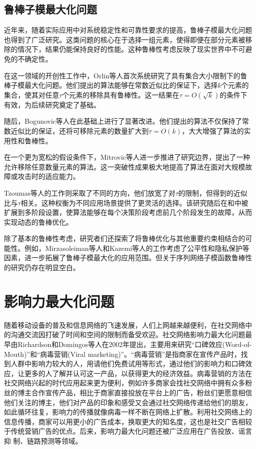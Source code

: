 \subsection{鲁棒子模最大化问题}

近年来，随着实际应用中对系统稳定性和可靠性要求的提高，鲁棒子模最大化问题也得到了广泛研究。这类问题的核心在于选择一组元素，使得即便在部分元素被移除的情况下，结果仍能保持良好的性能。这种鲁棒性考虑反映了现实世界中不可避免的不确定性。

在这一领域的开创性工作中，Orlin等人\cite{orlin2018robust}首次系统研究了具有集合大小限制下的鲁棒子模最大化问题。他们提出的算法能够在常数近似比的保证下，选择$k$个元素的集合，使其对任意$\tau$个元素的移除具有鲁棒性。这一结果在$\tau = O(\sqrt{k})$的条件下有效，为后续研究奠定了基础。

随后，Bogunovic等人\cite{bogunovic2017robust}在此基础上进行了显著改进。他们提出的算法不仅保持了常数近似比的保证，还将可移除元素的数量扩大到$\tau = O(k)$，大大增强了算法的实用性和鲁棒性。

在一个更为宽松的假设条件下，Mitrovic等人\cite{mitrovic2017streaming}进一步推进了研究边界，提出了一种允许移除任意数量元素的算法。这一突破性成果极大地提高了算法在面对大规模故障或攻击时的适应能力。

Tzoumas等人的工作\cite{tzoumas2017resilient}则采取了不同的方向，他们放宽了对$\tau$的限制，但得到的近似比与$\tau$相关。这种权衡为不同应用场景提供了更灵活的选择。该研究随后在\cite{tzoumas2018resilient}和\cite{tzoumas2020robust}中被扩展到多阶段设置，使算法能够在每个决策阶段考虑前几个阶段发生的故障，从而实现动态的鲁棒优化。

除了基本的鲁棒性考虑，研究者们还探索了将鲁棒优化与其他重要约束相结合的可能性。例如，Mirzasoleiman等人\cite{mirzasoleiman2017deletion}和Kazemi等人\cite{kazemi2018scalable}的工作考虑了公平性和隐私保护等因素，进一步拓展了鲁棒子模最大化的应用范围。但关于序列网络子模函数鲁棒性的研究仍存在明显空白。


\section{影响力最大化问题}
\label{sec:2_3}

随着移动设备的普及和信息网络的飞速发展，人们上网越来越便利，在社交网络中的沟通交流因打破了时间和空间的限制而备受欢迎。社交网络影响力最大化问题最早由Richardson和Domingos等人\cite{richardson2002mining}在2002年提出，主要用来研究“口碑效应(Word-of-Mouth)”和“病毒营销(Viral marketing)”。“病毒营销”是指商家在宣传产品时，找到人群中影响力较大的人，用请他们免费试用等形式，通过他们的影响力和口碑效应，让更多的人了解并认可这一产品，以获得更大的经济效益。病毒营销的方法在社交网络兴起的时代应用起来更为便利，例如许多商家会找社交网络中拥有众多粉丝的博主合作宣传产品，相比于商家直接投放在平台上的广告，粉丝们更愿意相信他们关注的博主，他们对产品的印象和感受又会通过社交网络传递给他们的朋友，如此循环往复，影响力的传播就像病毒一样不断在网络上扩散。利用社交网络上的信息传播，商家可以用更小的广告成本，换取更大的知名度，这也是社交广告相较于传统营销广告的优点。后来，影响力最大化问题还被广泛应用在广告投放\cite{zhang2020geodemographic,zeng2021business,saleem2019effective}、谣言抑
制\cite{shi2019adaptive,zhong2023rumor,myilsamy2024optimal}、链路预测\cite{tripathi2022network,daud2020applications}等领域。


